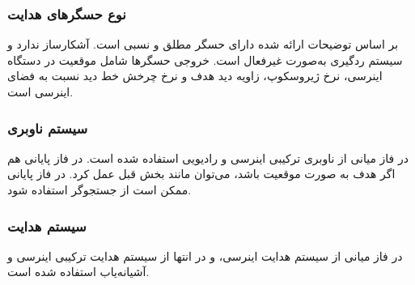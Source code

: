 \subsubsection{نوع حسگرهای هدایت}
بر اساس توضیحات ارائه شده دارای حسگر مطلق و نسبی است. آشکارساز ندارد و سیستم ردگیری به‌صورت غیرفعال است.
خروجی حسگرها شامل موقعیت در دستگاه اینرسی، نرخ ژیروسکوپ،  زاویه دید هدف و نرخ چرخش خط دید نسبت به فضای اینرسی است.
\subsubsection{سیستم ناوبری}
در فاز میانی از ناوبری ترکیبی اینرسی و رادیویی استفاده شده است. در فاز پایانی هم اگر هدف به صورت موقعیت باشد، می‌توان مانند بخش قبل عمل کرد. در فاز پایانی ممکن است از جستجوگر استفاده شود.
\subsubsection{سیستم هدایت}
در فاز میانی از سیستم هدایت اینرسی، و در انتها از سیستم هدایت ترکیبی  اینرسی و آشیانه‌یاب استفاده شده است.
